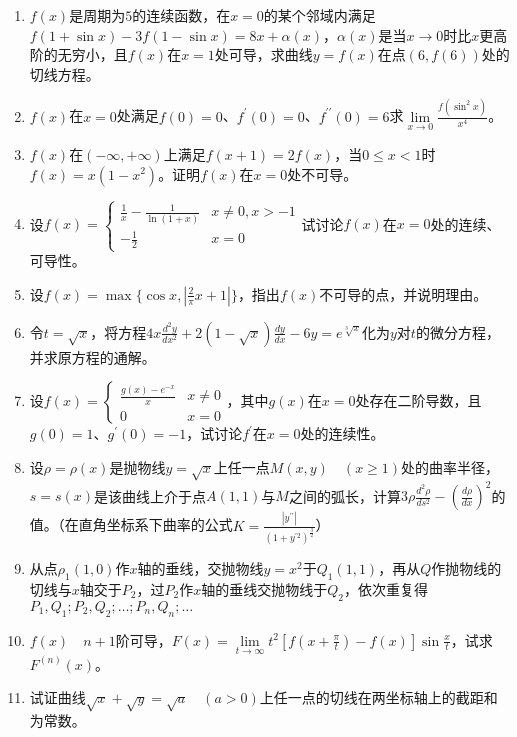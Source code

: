 \begin{enumerate}
    \item $f(x)$是周期为$5$的连续函数，在$x=0$的某个邻域内满足$f(1+\sin x)-3f(1-\sin x)=8x+\alpha(x)$，$\alpha(x)$是当$x\to 0$时比$x$更高阶的无穷小，且$f(x)$在$x=1$处可导，求曲线$y=f(x)$在点$(6,f(6))$处的切线方程。
    \item $f(x)$在$x=0$处满足$f(0)=0$、$f^{\prime}(0)=0$、$f^{\prime\prime}(0)=6$求$\lim\limits_{x \to 0}\frac{f(\sin ^2 x)}{x^4}$。
    \item $f(x)$在$(-\infty,+\infty)$上满足$f(x+1)=2f(x)$，当$0\leq x <1$时$f(x)=x(1-x^2)$。证明$f(x)$在$x=0$处不可导。
    \item 设$f(x)=\begin{cases}\frac{1}{x}-\frac{1}{\ln (1+x)} & x\neq 0,x>-1\\
                                -\frac{1}{2} & x=0
                            \end{cases}$试讨论$f(x)$在$x=0$处的连续、可导性。
    \item 设$f(x)=\max \{\cos x,\left|\frac{2}{\pi}x+1\right|\}$，指出$f(x)$不可导的点，并说明理由。
    \item 令$t=\sqrt{x}$，将方程$4x\frac{d^2 y}{d x^2}+2(1-\sqrt{x})\frac{dy}{dx}-6y=e^{\sqrt[3]{x}}$化为$y$对$t$的微分方程，并求原方程的通解。
    \item 设$f(x)=\begin{cases}\frac{g(x)-e^{-x}}{x} & x \neq 0\\
                                0 & x=0
                            \end{cases}$，其中$g(x)$在$x=0$处存在二阶导数，且$g(0)=1$、$g^{\prime}(0)=-1$，试讨论$f^{\prime}$在$x=0$处的连续性。
    \item 设$\rho =\rho (x)$是抛物线$y=\sqrt{x}$上任一点$M(x,y)\quad(x\geq 1)$处的曲率半径，$s=s(x)$是该曲线上介于点$A(1,1)$与$M$之间的弧长，计算$3\rho \frac{d^2 \rho}{d s^2}-(\frac{d \rho}{d x})^2$的值。（在直角坐标系下曲率的公式$K=\frac{\left|y^{\prime\prime}\right|}{(1+y^{\prime 2})^{\frac{3}{2}}}$）
    \item 从点$\rho_1(1,0)$作$x$轴的垂线，交抛物线$y=x^2$于$Q_1(1,1)$，再从$Q$作抛物线的切线与$x$轴交于$P_2$，过$P_2$作$x$轴的垂线交抛物线于$Q_2$，依次重复得$P_1,Q_1;P_2,Q_2;\dots;P_n,Q_n;\dots$
    \item $f(x)\quad n+1$阶可导，$F(x)=\lim\limits_{t \to \infty}t^2 [f(x+\frac{\pi}{t})-f(x)]\sin \frac{x}{t}$，试求$F^{(n)}(x)$。
    \item 试证曲线$\sqrt{x}+\sqrt{y}=\sqrt{a}\quad (a>0)$上任一点的切线在两坐标轴上的截距和为常数。
\end{enumerate}
